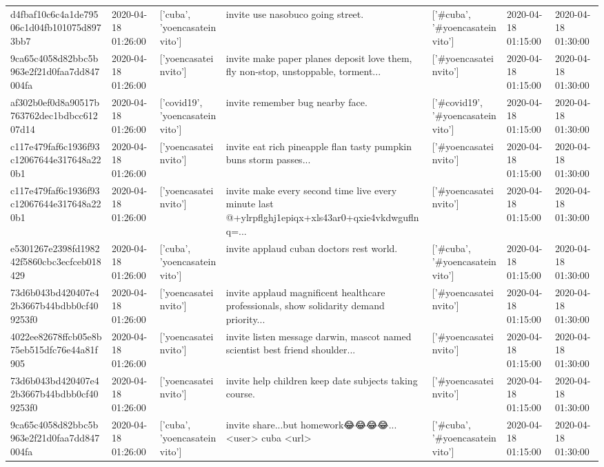 \begin{tabular}{lllllll}
d4fbaf10c6c4a1de79506c1d04fb101075d8973bb7 & 2020-04-18 01:26:00 & ['cuba', 'yoencasateinvito'] & invite use nasobuco going street. & ['#cuba', '#yoencasateinvito'] & 2020-04-18 01:15:00 & 2020-04-18 01:30:00 \\
9ca65c4058d82bbc5b963e2f21d0faa7dd847004fa & 2020-04-18 01:26:00 & ['yoencasateinvito'] & invite make paper planes deposit love them, fly non-stop, unstoppable, torment... & ['#yoencasateinvito'] & 2020-04-18 01:15:00 & 2020-04-18 01:30:00 \\
af302b0ef0d8a90517b763762dec1bdbcc61207d14 & 2020-04-18 01:26:00 & ['covid19', 'yoencasateinvito'] & invite remember bug nearby face. & ['#covid19', '#yoencasateinvito'] & 2020-04-18 01:15:00 & 2020-04-18 01:30:00 \\
c117e479faf6c1936f93c12067644e317648a220b1 & 2020-04-18 01:26:00 & ['yoencasateinvito'] & invite eat rich pineapple flan tasty pumpkin buns storm passes... & ['#yoencasateinvito'] & 2020-04-18 01:15:00 & 2020-04-18 01:30:00 \\
c117e479faf6c1936f93c12067644e317648a220b1 & 2020-04-18 01:26:00 & ['yoencasateinvito'] & invite make every second time live every minute last @+ylrpflghj1epiqx+xls43ar0+qxie4vkdwguflnq=... & ['#yoencasateinvito'] & 2020-04-18 01:15:00 & 2020-04-18 01:30:00 \\
e5301267e2398fd198242f5860cbc3ecfceb018429 & 2020-04-18 01:26:00 & ['cuba', 'yoencasateinvito'] & invite applaud cuban doctors rest world. & ['#cuba', '#yoencasateinvito'] & 2020-04-18 01:15:00 & 2020-04-18 01:30:00 \\
73d6b043bd420407e42b3667b44bdbb0cf409253f0 & 2020-04-18 01:26:00 & ['yoencasateinvito'] & invite applaud magnificent healthcare professionals, show solidarity demand priority... & ['#yoencasateinvito'] & 2020-04-18 01:15:00 & 2020-04-18 01:30:00 \\
4022ee82678ffcb05e8b75eb515dfc76e44a81f905 & 2020-04-18 01:26:00 & ['yoencasateinvito'] & invite listen message darwin, mascot named scientist best friend shoulder... & ['#yoencasateinvito'] & 2020-04-18 01:15:00 & 2020-04-18 01:30:00 \\
73d6b043bd420407e42b3667b44bdbb0cf409253f0 & 2020-04-18 01:26:00 & ['yoencasateinvito'] & invite help children keep date subjects taking course. & ['#yoencasateinvito'] & 2020-04-18 01:15:00 & 2020-04-18 01:30:00 \\
9ca65c4058d82bbc5b963e2f21d0faa7dd847004fa & 2020-04-18 01:26:00 & ['cuba', 'yoencasateinvito'] & invite share...but homework😂😂😂😂... <user> cuba <url> & ['#cuba', '#yoencasateinvito'] & 2020-04-18 01:15:00 & 2020-04-18 01:30:00 \\

\end{tabular}
